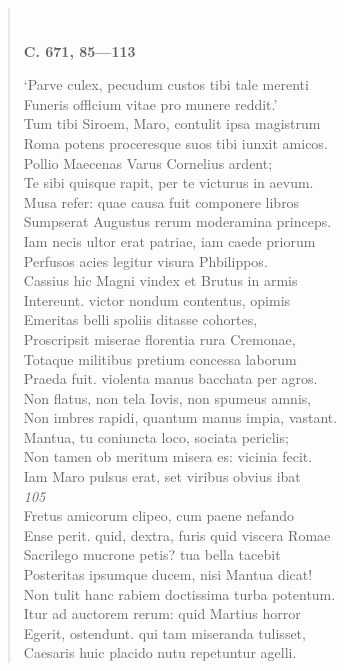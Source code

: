 \documentclass[11pt, a4paper]{report}
\begin{document}
\begin{verse}
        ﻿\pagebreak 
     \marginpar{[144]} \begin{center} \textbf{C. 671, 85—113} \end{center}‘Parve culex, pecudum custos tibi tale merenti \\ Funeris offlcium vitae pro munere reddit.’ \\ Tum tibi Siroem, Maro, contulit ipsa magistrum \\ Roma potens proceresque suos tibi iunxit amicos. \\ Pollio Maecenas Varus Cornelius ardent; \\ Te sibi quisque rapit, per te victurus in aevum. \\ Musa refer: quae causa fuit componere libros \\ Sumpserat Augustus rerum moderamina princeps. \\ Iam necis ultor erat patriae, iam caede priorum \\ Perfusos acies legitur visura Phbilippos. \\ Cassius hic Magni vindex et Brutus in armis \\ Intereunt. victor nondum contentus, opimis \\ Emeritas belli spoliis ditasse cohortes, \\ Proscripsit miserae florentia rura Cremonae, \\ Totaque militibus pretium concessa laborum \\ Praeda fuit. violenta manus bacchata per agros. \\ Non flatus, non tela Iovis, non spumeus amnis, \\ Non imbres rapidi, quantum manus impia, vastant. \\ Mantua, tu coniuncta loco, sociata periclis; \\ Non tamen ob meritum misera  \lbrack es: vicinia fecit. \\ Iam Maro pulsus erat, set viribus obvius ibat \\ \textit{105} \\ Fretus amicorum clipeo, cum paene nefando \\ Ense perit. quid, dextra, furis quid viscera Romae \\ Sacrilego mucrone petis? tua bella tacebit \\ Posteritas ipsumque ducem, nisi Mantua dicat! \\ Non tulit hanc rabiem doctissima turba potentum. \\ Itur ad auctorem rerum: quid Martius horror \\ Egerit, ostendunt. qui tam miseranda tulisset, \\ Caesaris huic placido nutu repetuntur agelli. \\ 

\end{verse}
\end{document}
